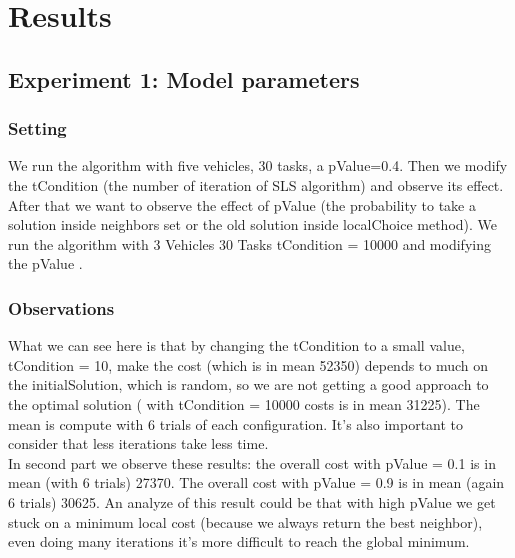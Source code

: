 \documentclass[10.5pt]{article}
\begin{document}
\section{Results}

\subsection{Experiment 1: Model parameters}

\subsubsection{Setting}
We run the algorithm with five vehicles, 30 tasks, a pValue=0.4. Then we modify the tCondition (the number of iteration of SLS algorithm) and observe its effect.\\
After that we want to observe the effect of pValue (the probability to take a solution inside neighbors set or the old solution inside localChoice method). We run the algorithm with 3 Vehicles 30 Tasks tCondition = 10000 and modifying the pValue .


\subsubsection{Observations}
What we can see here is that by changing the tCondition to a small value,  tCondition = 10, make the cost (which is in mean 52350) depends to much on the initialSolution, which is random, so we are not getting a good approach to the optimal solution ( with tCondition = 10000 costs is in mean 31225). The mean is compute with 6 trials of each configuration. It's also important to consider that less iterations take less time.\\
In second part we observe these results: the overall cost with pValue = 0.1 is in mean (with 6 trials) 27370. The overall cost with pValue = 0.9 is in mean (again 6 trials) 30625. An analyze of this result could be that with high pValue we get stuck on a minimum local cost (because we always return the best neighbor), even doing many iterations it's more difficult to reach the global minimum.

\end{document}
